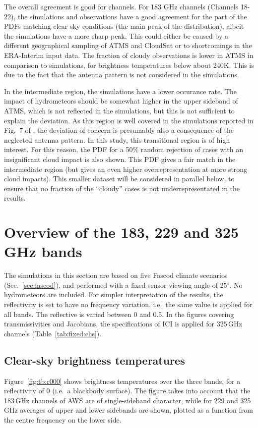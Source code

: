 \documentclass[12pt]{article}
\begin{document}
The overall agreement is good for channels. For 183 GHz channels (Channels
18-22), the simulations and observations have a good agreement for the part of
the PDFs matching clear-sky conditions (the main peak of the distribution),
albeit the simulations have a more sharp peak. This could either be caused by a
different geographical sampling of ATMS and CloudSat or to shortcomings in the
ERA-Interim input data. The fraction of cloudy observations is lower in ATMS in
comparison to simulations, for brightness temperatures below about 240\.K. This
is due to the fact that the antenna pattern is not considered in the
simulations.

In the intermediate region, the simulations have a lower occurance rate. The
impact of hydrometeors should be somewhat higher in the upper sideband of ATMS,
which is not reflected in the simulations, but this is not sufficient to
explain the deviation. As this region is well covered in the simulations
reported in Fig.~7 of \citep{eriksson:towar:20}, the deviation of concern is
presumably also a consequence of the neglected antenna pattern. In this study,
this transitional region is of high interest. For this reason, the PDF for a
50\% random rejection of cases with an insignificant cloud impact is also
shown. This PDF gives a fair match in the intermediate region (but gives an
even higher overrepresentation at more strong cloud impacts). This smaller
dataset will be considered in parallel below, to ensure that no fraction of the
``cloudy'' cases is not underrepresentated in the results.





\section{Overview of the 183, 229 and 325\,GHz bands}
%
The simulations in this section are based on five Fascod climate scenarios
(Sec.~\ref{sec:fascod}), and performed with a fixed sensor viewing angle of
25$^\circ$. No hydrometeors are included. For simpler interpretation of the
results, the reflectivity is set to have no frequency variation, i.e.\ the same
value is applied for all bands. The reflective is varied between 0 and 0.5.
In the figures covering transmissivities and Jacobians, the specifications
of ICI is applied for 325\,GHz channels (Table~\ref{tab:fixed:chs}).


\subsection{Clear-sky brightness temperatures}
%
Figure~\ref{fig:tb:r000} shows brightness temperatures over the three bands, for
a reflectivity of 0 (i.e.\ a blackbody surface). The figure takes into account
that the 183\,GHz channels of AWS are of single-sideband character, while for
229 and 325\,GHz averages of upper and lower sidebands are shown, plotted as
a function from the centre frequency on the lower side.
\end{document}
